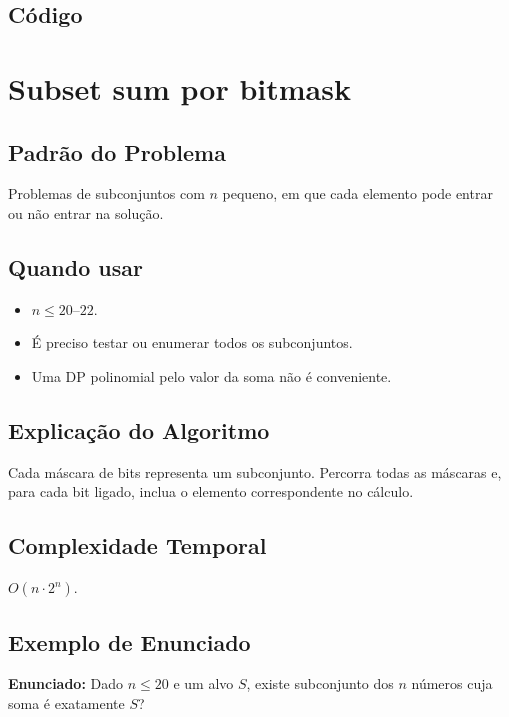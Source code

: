 \subsection{Código}

\section{Subset sum por bitmask}

\subsection{Padrão do Problema}
Problemas de subconjuntos com $n$ pequeno, em que cada elemento pode entrar ou não entrar na solução.

\subsection{Quando usar}
\begin{itemize}[nosep]
  \item $n \leq 20$--$22$.
  \item É preciso testar ou enumerar todos os subconjuntos.
  \item Uma DP polinomial pelo valor da soma não é conveniente.
\end{itemize}

\subsection{Explicação do Algoritmo}
Cada máscara de bits representa um subconjunto. Percorra todas as máscaras e, para cada bit ligado, inclua o elemento correspondente no cálculo.

\subsection{Complexidade Temporal}
$O(n \cdot 2^n)$.

\subsection{Exemplo de Enunciado}
\begin{exemplodiabox}
\textbf{Enunciado:} Dado $n \leq 20$ e um alvo $S$, existe subconjunto dos $n$ números cuja soma é exatamente $S$?
\end{exemplodiabox}

